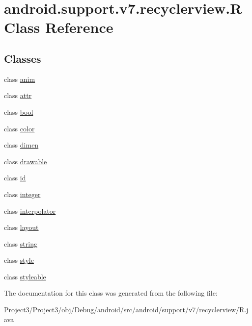 \hypertarget{classandroid_1_1support_1_1v7_1_1recyclerview_1_1R}{}\section{android.\+support.\+v7.\+recyclerview.\+R Class Reference}
\label{classandroid_1_1support_1_1v7_1_1recyclerview_1_1R}
\subsection*{Classes}
\begin{DoxyCompactItemize}
\item 
class \hyperlink{classandroid_1_1support_1_1v7_1_1recyclerview_1_1R_1_1anim}{anim}
\item 
class \hyperlink{classandroid_1_1support_1_1v7_1_1recyclerview_1_1R_1_1attr}{attr}
\item 
class \hyperlink{classandroid_1_1support_1_1v7_1_1recyclerview_1_1R_1_1bool}{bool}
\item 
class \hyperlink{classandroid_1_1support_1_1v7_1_1recyclerview_1_1R_1_1color}{color}
\item 
class \hyperlink{classandroid_1_1support_1_1v7_1_1recyclerview_1_1R_1_1dimen}{dimen}
\item 
class \hyperlink{classandroid_1_1support_1_1v7_1_1recyclerview_1_1R_1_1drawable}{drawable}
\item 
class \hyperlink{classandroid_1_1support_1_1v7_1_1recyclerview_1_1R_1_1id}{id}
\item 
class \hyperlink{classandroid_1_1support_1_1v7_1_1recyclerview_1_1R_1_1integer}{integer}
\item 
class \hyperlink{classandroid_1_1support_1_1v7_1_1recyclerview_1_1R_1_1interpolator}{interpolator}
\item 
class \hyperlink{classandroid_1_1support_1_1v7_1_1recyclerview_1_1R_1_1layout}{layout}
\item 
class \hyperlink{classandroid_1_1support_1_1v7_1_1recyclerview_1_1R_1_1string}{string}
\item 
class \hyperlink{classandroid_1_1support_1_1v7_1_1recyclerview_1_1R_1_1style}{style}
\item 
class \hyperlink{classandroid_1_1support_1_1v7_1_1recyclerview_1_1R_1_1styleable}{styleable}
\end{DoxyCompactItemize}


The documentation for this class was generated from the following file\+:\begin{DoxyCompactItemize}
\item 
Project3/\+Project3/obj/\+Debug/android/src/android/support/v7/recyclerview/R.\+java\end{DoxyCompactItemize}
